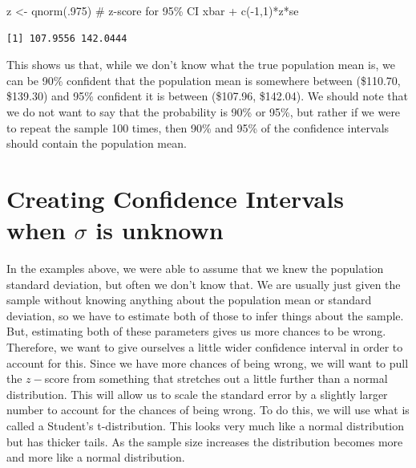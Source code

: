 \documentclass[
  letterpaper,
  DIV=11,
  numbers=noendperiod]{scrreprt}
\newenvironment{Shaded}{\begin{snugshade}}{\end{snugshade}}
\newcommand{\CommentTok}[1]{\textcolor[rgb]{0.37,0.37,0.37}{#1}}
\newcommand{\DecValTok}[1]{\textcolor[rgb]{0.68,0.00,0.00}{#1}}
\newcommand{\FunctionTok}[1]{\textcolor[rgb]{0.28,0.35,0.67}{#1}}
\newcommand{\NormalTok}[1]{\textcolor[rgb]{0.00,0.23,0.31}{#1}}
\newcommand{\OtherTok}[1]{\textcolor[rgb]{0.00,0.23,0.31}{#1}}
\newcommand{\SpecialCharTok}[1]{\textcolor[rgb]{0.37,0.37,0.37}{#1}}
\begin{document}
\begin{Shaded}
\begin{Highlighting}[]
\NormalTok{z }\OtherTok{\textless{}{-}} \FunctionTok{qnorm}\NormalTok{(.}\DecValTok{975}\NormalTok{) }\CommentTok{\# z{-}score for 95\% CI}
\NormalTok{xbar }\SpecialCharTok{+} \FunctionTok{c}\NormalTok{(}\SpecialCharTok{{-}}\DecValTok{1}\NormalTok{,}\DecValTok{1}\NormalTok{)}\SpecialCharTok{*}\NormalTok{z}\SpecialCharTok{*}\NormalTok{se}
\end{Highlighting}
\end{Shaded}

\begin{verbatim}
[1] 107.9556 142.0444
\end{verbatim}

This shows us that, while we don't know what the true population mean
is, we can be 90\% confident that the population mean is somewhere
between (\$110.70, \$139.30) and 95\% confident it is between (\$107.96,
\$142.04). We should note that we do not want to say that the
probability is 90\% or 95\%, but rather if we were to repeat the sample
100 times, then 90\% and 95\% of the confidence intervals should contain
the population mean.

\section{\texorpdfstring{Creating Confidence Intervals when \(\sigma\)
is
unknown}{Creating Confidence Intervals when \textbackslash sigma is unknown}}\label{creating-confidence-intervals-when-sigma-is-unknown}

In the examples above, we were able to assume that we knew the
population standard deviation, but often we don't know that. We are
usually just given the sample without knowing anything about the
population mean or standard deviation, so we have to estimate both of
those to infer things about the sample. But, estimating both of these
parameters gives us more chances to be wrong. Therefore, we want to give
ourselves a little wider confidence interval in order to account for
this. Since we have more chances of being wrong, we will want to pull
the \(z-\)score from something that stretches out a little further than
a normal distribution. This will allow us to scale the standard error by
a slightly larger number to account for the chances of being wrong. To
do this, we will use what is called a Student's t-distribution. This
looks very much like a normal distribution but has thicker tails. As the
sample size increases the distribution becomes more and more like a
normal distribution.
\end{document}
